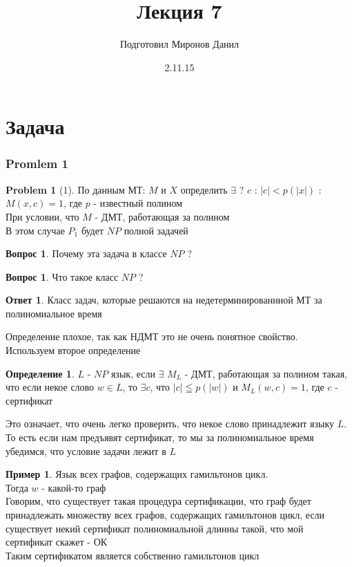 \documentclass{beamer}
\title{Лекция 7}
\author{Подготовил Миронов Данил}
\theoremstyle{plain}
\theoremstyle{definition}
\newtheorem{dfn}[thm]{Определение}
\newtheorem{Q}[thm]{Вопрос}
\newtheorem{prob}[thm]{Problem}
\newtheorem{A}[thm]{Ответ}
\newtheorem{ex}[thm]{Пример}
\begin{document}
\date{2.11.15}




\section{Задача}
\begin{frame}
	\frametitle{Promlem 1}
	\begin{prob}[1]
		По данным МТ: $M$ и $X$ определить $\exists$ ? $c$ : $|c|<p(|x|)$ : $M(x,c)=1$, где $p$ - известный полином \\
		При условии, что $M$ - ДМТ, работающая за полином \\
		В этом случае $P_1$ будет $NP$ полной задачей
	\end{prob}
	\begin{Q}
	    Почему эта задача в классе $NP$ ?	
	\end{Q}
\end{frame}

\begin{frame}
	\begin{Q}
	    Что такое класс $NP$ ?	
	\end{Q}
	\begin{A}
	    Класс задач, которые решаются на недетерминированнной МТ за полиномиальное время	
	\end{A}
	Определение плохое, так как НДМТ это не очень понятное свойство.\\
	Используем второе определение
\end{frame}

\begin{frame}
    \begin{dfn}
        $L$ - $NP$ язык, если $\exists$ $M_L$ - ДМТ, работающая за полином такая, что если некое слово $w\in L$, то $\exists c$, что $|c|\leqq p(|w|)$ и $M_L(w,c)=1$, где $c$ - сертификат
    \end{dfn}
    Это означает, что очень легко проверить, что некое слово принадлежит языку $L$. То есть если нам предъявят сертификат, то мы за полиномиальное время убедимся, что условие задачи лежит в $L$ 
\end{frame}

\begin{frame}
	\begin{ex}
	    Язык всех графов, содержащих гамильтонов цикл. \\
	    Тогда $w$ - какой-то граф \\
	    Говорим, что существует такая процедура сертификации, что граф будет принадлежать множеству всех графов, содержащих гамильтонов цикл, если существует некий сертификат полиномиальной длинны такой, что мой сертификат скажет - ОК \\
	    Таким сертификатом является собственно гамильтонов цикл
	\end{ex}
\end{frame}
\end{document}

